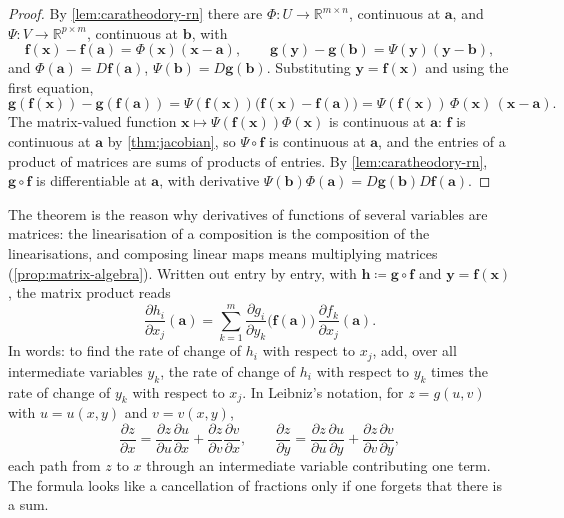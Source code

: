 \begin{proof}
By \cref{lem:caratheodory-rn} there are $\Phi\colon U\to\mathbb R^{m\times n}$, continuous at $\mathbf a$, and $\Psi\colon V\to\mathbb R^{p\times m}$, continuous at $\mathbf b$, with
\[
\mathbf f(\mathbf x)-\mathbf f(\mathbf a)=\Phi(\mathbf x)(\mathbf x-\mathbf a),\qquad\mathbf g(\mathbf y)-\mathbf g(\mathbf b)=\Psi(\mathbf y)(\mathbf y-\mathbf b),
\]
and $\Phi(\mathbf a)=D\mathbf f(\mathbf a)$, $\Psi(\mathbf b)=D\mathbf g(\mathbf b)$. Substituting $\mathbf y=\mathbf f(\mathbf x)$ and using the first equation,
\[
\mathbf g(\mathbf f(\mathbf x))-\mathbf g(\mathbf f(\mathbf a))=\Psi(\mathbf f(\mathbf x))\bigl(\mathbf f(\mathbf x)-\mathbf f(\mathbf a)\bigr)=\Psi(\mathbf f(\mathbf x))\,\Phi(\mathbf x)\,(\mathbf x-\mathbf a).
\]
The matrix-valued function $\mathbf x\mapsto\Psi(\mathbf f(\mathbf x))\Phi(\mathbf x)$ is continuous at $\mathbf a$: $\mathbf f$ is continuous at $\mathbf a$ by \cref{thm:jacobian}, so $\Psi\circ\mathbf f$ is continuous at $\mathbf a$, and the entries of a product of matrices are sums of products of entries. By \cref{lem:caratheodory-rn}, $\mathbf g\circ\mathbf f$ is differentiable at $\mathbf a$, with derivative $\Psi(\mathbf b)\Phi(\mathbf a)=D\mathbf g(\mathbf b)D\mathbf f(\mathbf a)$.
\end{proof}

The theorem is the reason why derivatives of functions of several variables are matrices: the linearisation of a composition is the composition of the linearisations, and composing linear maps means multiplying matrices (\cref{prop:matrix-algebra}). Written out entry by entry, with $\mathbf h\coloneqq\mathbf g\circ\mathbf f$ and $\mathbf y=\mathbf f(\mathbf x)$, the matrix product reads
\begin{equation}
\frac{\partial h_i}{\partial x_j}(\mathbf a)=\sum_{k=1}^m\frac{\partial g_i}{\partial y_k}\bigl(\mathbf f(\mathbf a)\bigr)\,\frac{\partial f_k}{\partial x_j}(\mathbf a).
\label{eq:chain-coordinates}
\end{equation}
In words: to find the rate of change of $h_i$ with respect to $x_j$, add, over all intermediate variables $y_k$, the rate of change of $h_i$ with respect to $y_k$ times the rate of change of $y_k$ with respect to $x_j$. In Leibniz's notation, for $z=g(u,v)$ with $u=u(x,y)$ and $v=v(x,y)$,
\[
\frac{\partial z}{\partial x}=\frac{\partial z}{\partial u}\frac{\partial u}{\partial x}+\frac{\partial z}{\partial v}\frac{\partial v}{\partial x},\qquad\frac{\partial z}{\partial y}=\frac{\partial z}{\partial u}\frac{\partial u}{\partial y}+\frac{\partial z}{\partial v}\frac{\partial v}{\partial y},
\]
each path from $z$ to $x$ through an intermediate variable contributing one term. The formula looks like a cancellation of fractions only if one forgets that there is a sum.

